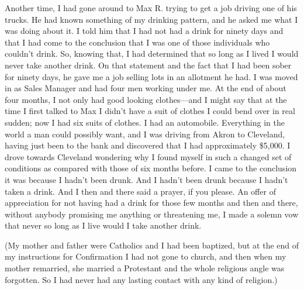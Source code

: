 \begin{biblechapter}
\verse Another time, 
    I had gone around to Max R. 
    trying to get a job driving one of his trucks.
\verse He had known something of my drinking pattern, 
    and he asked me what I was doing about it.
\verse I told him that I had not had a drink for ninety days 
    and that I had come to the conclusion 
    that I was one of those individuals who couldn’t drink.
\verse So, knowing that, 
    I had determined that so long as I lived 
    I would never take another drink.
\verse On that statement 
    and the fact that I had been sober for ninety days, 
    he gave me a job selling lots in an allotment he had.
\verse I was moved in as Sales Manager 
    and had four men working under me.
\verse At the end of about four months, 
    I not only had good looking clothes—and 
    I might say that at the time I first talked to Max 
    I didn’t have a suit of clothes I could bend over in real sudden; 
    now I had six suits of clothes.
\verse I had an automobile.
\verse Everything in the world a man could possibly want, 
    and I was driving from Akron to Cleveland, 
    having just been to the bank 
    and discovered that I had approximately \$5,000.
\verse I drove towards Cleveland 
    wondering why I found myself in such a changed set of conditions 
    as compared with those of six months before.
\verse I came to the conclusion it was because I hadn’t been drunk.
\verse And I hadn’t been drunk because I hadn’t taken a drink.
\verse And I then and there said a prayer, if you please.
\verse An offer of appreciation for not having had a drink 
    for those few months 
    and then and there, 
    without anybody promising me anything or threatening me, 
    I made a solemn vow that never so long as I live 
    would I take another drink.

\verse (My mother and father were Catholics and I had been baptized, 
    but at the end of my instructions for Confirmation 
    I had not gone to church, 
    and then when my mother remarried, 
    she married a Protestant and the whole religious angle was forgotten.
\verse So I had never had any lasting contact with any kind of religion.)


\end{biblechapter}
